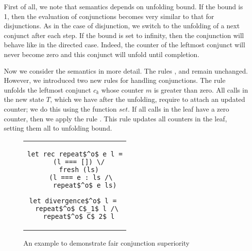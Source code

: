 First of all, we note that semantics depends on unfolding bound. If the bound is 1, then the evaluation of conjunctions becomes very similar to that for disjunctions. As in the case of
disjunction, we switch to the unfolding of a next conjunct after each step. If the bound is set to infinity, then the conjunction will behave like in the directed case. Indeed,
the counter of the leftmost conjunct will never become zero and this conjunct will unfold until completion.

Now we consider the semantics in more detail. The rules ,  and  remain unchanged. However, we introduced two new rules for handling conjunctions.
The rule  unfolds the leftmost conjunct $c_k$ whose counter $m$ is greater than zero. All calls in the new state $T$, which we have after the unfolding,
require to attach an updated counter; we do this using the function $set$. If all calls in the leaf have a zero counter, then we apply the rule .
This rule updates all counters in the leaf, setting them all to unfolding bound.

\begin{figure}[h]
\centering
\begin{tabular}{c}
\begin{lstlisting}
let rec repeat$^o$ e l =
  (l === []) \/
  fresh (ls)
    (l === e : ls /\ 
     repeat$^o$ e ls)
     
let divergence$^o$ l = 
  repeat$^o$ C$_1$ l /\ 
  repeat$^o$ C$_2$ l
\end{lstlisting}
\end{tabular}

\caption{An example to demonstrate fair conjunction superiority}
\label{fair:lst-repeato}
\end{figure}

